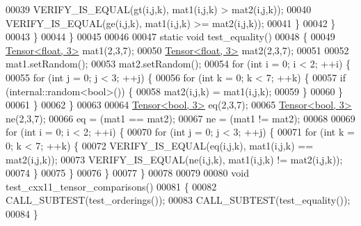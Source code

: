 \begin{DoxyCode}
00039         VERIFY\_IS\_EQUAL(gt(i,j,k), mat1(i,j,k) > mat2(i,j,k));
00040         VERIFY\_IS\_EQUAL(ge(i,j,k), mat1(i,j,k) >= mat2(i,j,k));
00041       \}
00042     \}
00043   \}
00044 \}
00045 
00046 
00047 \textcolor{keyword}{static} \textcolor{keywordtype}{void} test\_equality()
00048 \{
00049   \hyperlink{class_eigen_1_1_tensor}{Tensor<float, 3>} mat1(2,3,7);
00050   \hyperlink{class_eigen_1_1_tensor}{Tensor<float, 3>} mat2(2,3,7);
00051 
00052   mat1.setRandom();
00053   mat2.setRandom();
00054   \textcolor{keywordflow}{for} (\textcolor{keywordtype}{int} i = 0; i < 2; ++i) \{
00055     \textcolor{keywordflow}{for} (\textcolor{keywordtype}{int} j = 0; j < 3; ++j) \{
00056       \textcolor{keywordflow}{for} (\textcolor{keywordtype}{int} k = 0; k < 7; ++k) \{
00057         \textcolor{keywordflow}{if} (internal::random<bool>()) \{
00058           mat2(i,j,k) = mat1(i,j,k);
00059         \}
00060       \}
00061     \}
00062   \}
00063 
00064   \hyperlink{class_eigen_1_1_tensor}{Tensor<bool, 3>} eq(2,3,7);
00065   \hyperlink{class_eigen_1_1_tensor}{Tensor<bool, 3>} ne(2,3,7);
00066   eq = (mat1 == mat2);
00067   ne = (mat1 != mat2);
00068 
00069   \textcolor{keywordflow}{for} (\textcolor{keywordtype}{int} i = 0; i < 2; ++i) \{
00070     \textcolor{keywordflow}{for} (\textcolor{keywordtype}{int} j = 0; j < 3; ++j) \{
00071       \textcolor{keywordflow}{for} (\textcolor{keywordtype}{int} k = 0; k < 7; ++k) \{
00072         VERIFY\_IS\_EQUAL(eq(i,j,k), mat1(i,j,k) == mat2(i,j,k));
00073         VERIFY\_IS\_EQUAL(ne(i,j,k), mat1(i,j,k) != mat2(i,j,k));
00074       \}
00075     \}
00076   \}
00077 \}
00078 
00079 
00080 \textcolor{keywordtype}{void} test\_cxx11\_tensor\_comparisons()
00081 \{
00082   CALL\_SUBTEST(test\_orderings());
00083   CALL\_SUBTEST(test\_equality());
00084 \}
\end{DoxyCode}
